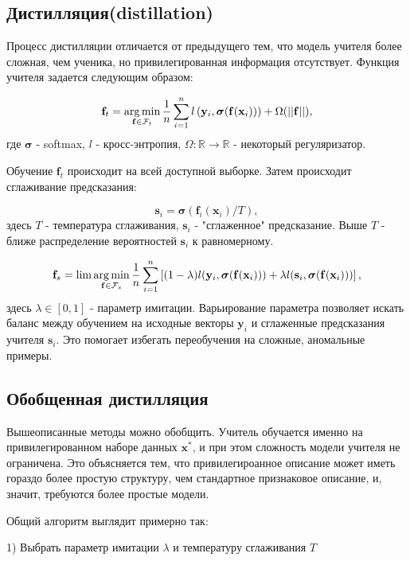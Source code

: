 \documentclass[12pt,twoside]{article}
\begin{document}
\subsection{Дистилляция(distillation)}
Процесс дистилляции отличается от предыдущего тем, что модель учителя более сложная, чем ученика, но привилегированная информация отсутствует. Функция учителя задается следующим образом:

$$ \mathbf{f}_t = \argmin\limits_{\mathbf{f} \in \mathcal{F}_t} \frac{1}{n} \sum\limits_{i=1}^n l
\left(\mathbf{y}_i, \boldsymbol{\sigma}(\mathbf{f}(\mathbf{x}_i)) \right) 
+ \Omega (|| \mathbf{f}||),
$$
где $  \boldsymbol{\sigma} $ - softmax, $l$ - кросс-энтропия, $\Omega : \mathbb{R} \rightarrow \mathbb{R} $ - некоторый регуляризатор.

Обучение $\mathbf{f}_t$ происходит на всей доступной выборке. Затем происходит сглаживание предсказания:

$$ \mathbf{s}_i =  \boldsymbol{\sigma} (\mathbf{f}_i (\mathbf{x}_i)/ T), $$
здесь $T$ - температура сглаживания, $\mathbf{s}_i$ - "сглаженное" предсказание. Выше $T$ - ближе распределение вероятностей $\mathbf{s}_i$ к равномерному.


$$ \mathbf{f}_s = \lim\argmin_{\mathbf{f} \in \mathcal{F}_s} \frac{1}{n} \sum\limits_{i=1}^n
\left[ (1 - \lambda) l(\mathbf{y}_i, \boldsymbol{\sigma} (\mathbf{f}(\mathbf{x}_i))) 
+ \lambda l (\mathbf{s}_i, \boldsymbol{\sigma} (\mathbf{f}(\mathbf{x}_i))) \right],$$
здесь $\lambda \in [0, 1]$ - параметр имитации. Варьирование параметра позволяет искать баланс между обучением на исходные векторы $\mathbf{y}_i$ и сглаженные предсказания учителя $\mathbf{s}_i$. Это помогает избегать переобучения на сложные, аномальные примеры.

\subsection{Обобщенная дистилляция}

Вышеописанные методы можно обобщить. Учитель обучается именно на  привилегированном наборе данных $\mathbf{x}^*$, 
и при этом сложность модели учителя не ограничена. Это объясняется тем, что привилегироанное описание может иметь гораздо более простую структуру, чем стандартное признаковое описание, и, значит, требуются более простые модели. 

Общий алгоритм выглядит примерно так:

1) Выбрать параметр имитации $\lambda$ и температуру сглаживания $T$
\end{document}
